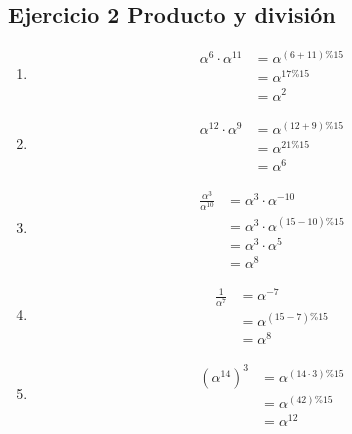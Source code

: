 \documentclass[11pt,fleqn]{article}
\begin{document}
\subsection*{Ejercicio 2 Producto y división}
\begin{enumerate}[label=\alph*)]
\item {}
\begin{align*}
    \alpha^6\cdot\alpha^{11}
    &=\alpha^{(6+11)\%15}\\
    &=\alpha^{17\%15}\\
    &=\alpha^2
\end{align*}

\item {}
\begin{align*}
    \alpha^{12}\cdot\alpha^9
    &=\alpha^{(12+9)\%15}\\
    &=\alpha^{21\%15}\\
    &=\alpha^6
\end{align*}

\item {}
\begin{align*}
    \frac{\alpha^3}{\alpha^{10}}
    &=\alpha^3\cdot\alpha^{-10}\\
    &=\alpha^3\cdot\alpha^{(15-10)\%15}\\
    &=\alpha^3\cdot\alpha^5\\
    &=\alpha^8
\end{align*}

\item {}
\begin{align*}
    \frac{1}{\alpha^7}
    &=\alpha^{-7}\\
    &=\alpha^{(15-7)\%15}\\
    &=\alpha^8
\end{align*}

\item {}
\begin{align*}
    (\alpha^{14})^3
    &=\alpha^{(14\cdot3)\%15}\\
    &=\alpha^{(42)\%15}\\
    &=\alpha^{12}
\end{align*}

\end{enumerate}
\end{document}
